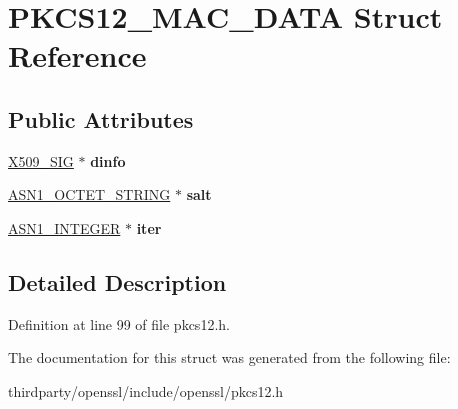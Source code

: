 \hypertarget{struct_p_k_c_s12___m_a_c___d_a_t_a}{}\section{P\+K\+C\+S12\+\_\+\+M\+A\+C\+\_\+\+D\+A\+TA Struct Reference}
\label{struct_p_k_c_s12___m_a_c___d_a_t_a}
\subsection*{Public Attributes}
\begin{DoxyCompactItemize}
\item 
\mbox{\label{struct_p_k_c_s12___m_a_c___d_a_t_a_af1f129d63901a78afc5efe5b7e20ceff}} 
\hyperlink{struct_x509__sig__st}{X509\+\_\+\+S\+IG} $\ast$ {\bfseries dinfo}
\item 
\mbox{\label{struct_p_k_c_s12___m_a_c___d_a_t_a_aa20b01b05e8dc10b03a8f49a1c683559}} 
\hyperlink{structasn1__string__st}{A\+S\+N1\+\_\+\+O\+C\+T\+E\+T\+\_\+\+S\+T\+R\+I\+NG} $\ast$ {\bfseries salt}
\item 
\mbox{\label{struct_p_k_c_s12___m_a_c___d_a_t_a_a7c5060546ea3ebee4d8bf1b087f6e567}} 
\hyperlink{structasn1__string__st}{A\+S\+N1\+\_\+\+I\+N\+T\+E\+G\+ER} $\ast$ {\bfseries iter}
\end{DoxyCompactItemize}


\subsection{Detailed Description}


Definition at line 99 of file pkcs12.\+h.



The documentation for this struct was generated from the following file\+:\begin{DoxyCompactItemize}
\item 
thirdparty/openssl/include/openssl/pkcs12.\+h\end{DoxyCompactItemize}
